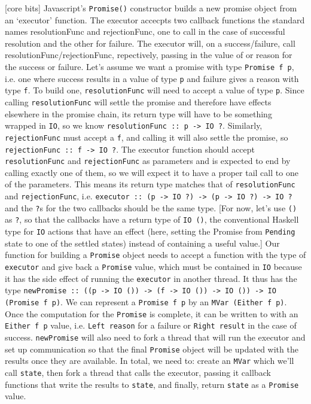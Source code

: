 \documentclass[12pt, english, letterpaper]{kuthesis}
\newcommand{\lit}[1]{\texttt{#1}}
\begin{document}
[core bits]
Javascript's \lit{Promise()} constructor builds a new promise object from an `executor' function.  The executor accecpts two callback functions the standard names resolutionFunc and rejectionFunc, one to call in the case of successful resolution and the other for failure.  The executor will, on a success/failure, call resolutionFunc/rejectionFunc, repectively, passing in the value of or reason for the success or failure.  Let's assume we want a promise with type \lit{Promise f p}, i.e. one where success results in a value of type \lit p and failure gives a reason with type \lit f.  To build one, \lit{resolutionFunc} will need to accept a value of type \lit p.  Since calling \lit{resolutionFunc} will settle the promise and therefore have effects elsewhere in the promise chain, its return type will have to be something wrapped in \lit{IO}, so we know \lit{resolutionFunc :: p -> IO ?}.  Similarly, \lit{rejectionFunc} must accept a \lit f, and calling it will also settle the promise, so \lit{rejectionFunc :: f -> IO ?}.  The executor function should accept \lit{resolutionFunc} and \lit{rejectionFunc} as parameters and is expected to end by calling exactly one of them, so we will expect it to have a proper tail call to one of the parameters.  This means its return type matches that of \lit{resolutionFunc} and \lit{rejectionFunc}, i.e. \lit{executor :: (p -> IO ?) -> (p -> IO ?) -> IO ?} and the \lit ?s for the two callbacks should be the same type.  [For now, let's use \lit{()} as \lit ?, so that the callbacks have a return type of \lit{IO ()}, the conventional Haskell type for \lit{IO} actions that have an effect (here, setting the Promise from \lit{Pending} state to one of the settled states) instead of containing a useful value.]  Our function for building a \lit{Promise} object needs to accept a function with the type of \lit{executor} and give back a \lit{Promise} value, which must be contained in \lit{IO} because it has the side effect of running the \lit{executor} in another thread.  It thus has the type \lit{newPromise :: ((p -> IO ()) -> (f -> IO ()) -> IO ()) -> IO (Promise f p)}.  We can represent a \lit{Promise f p} by an \lit{MVar (Either f p)}.  Once the computation for the \lit{Promise} is complete, it can be written to with an \lit{Either f p} value, i.e. \lit{Left reason} for a failure or \lit{Right result} in the case of success.  \lit{newPromise} will also need to fork a thread that will run the executor and set up communication so that the final \lit{Promise} object will be updated with the results once they are available.  In total, we need to: create an \lit{MVar} which we'll call \lit{state}, then fork a thread that calls the executor, passing it callback functions that write the results to \lit{state}, and finally, return \lit{state} as a \lit{Promise} value.
\end{document}

